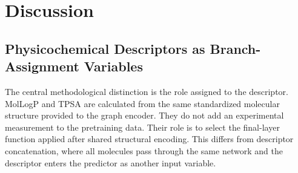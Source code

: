 \documentclass[journal=jcisd8,manuscript=article]{achemso}
\begin{document}
\begin{table}[t]
\centering
\caption{Analytical model complexity and observed successful-job runtime. Stored totals use the shared non-FFN parameter count plus the implemented branch parameters. Active FFN parameters for mixed models are occupancy-weighted. KAN FLOPs exclude spline-basis evaluation overhead. Finetuning times describe Slurm accounting records and are not a controlled architecture benchmark.}
\label{tab:efficiency}
\end{table}


\section{Discussion}
\label{sec:discussion}

\subsection{Physicochemical Descriptors as Branch-Assignment Variables}

The central methodological distinction is the role assigned to the descriptor. MolLogP and TPSA are calculated from the same standardized molecular structure provided to the graph encoder. They do not add an experimental measurement to the pretraining data. Their role is to select the final-layer function applied after shared structural encoding. This differs from descriptor concatenation, where all molecules pass through the same network and the descriptor enters the predictor as another input variable.
\end{document}
